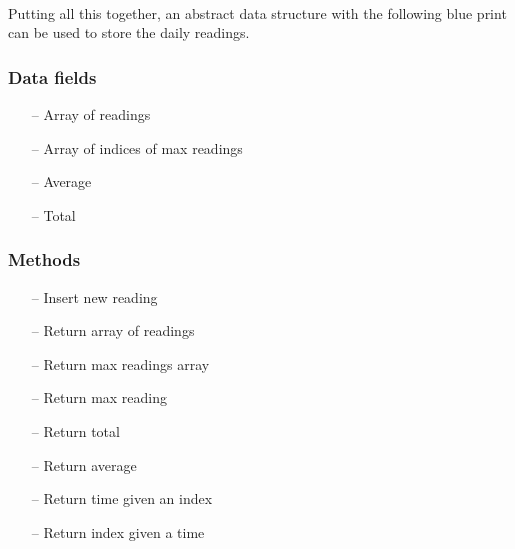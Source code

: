 \documentclass[12pt]{article}
\begin{document}
\paragraph{}Putting all this together, an abstract data structure with the following blue print can be used to store the daily readings.
\subsubsection{Data fields}
\begin{enumerate}
	\item[--] Array of readings
	\item[--] Array of indices of max readings
	\item[--] Average
	\item[--] Total
\end{enumerate}
\subsubsection{Methods}
\begin{enumerate}
	\item[--] Insert new reading
	\item[--] Return array of readings
	\item[--] Return max readings array
	\item[--] Return max reading
	\item[--] Return total
	\item[--] Return average
	\item[--] Return time given an index
	\item[--] Return index given a time
\end{enumerate}
\end{document}
